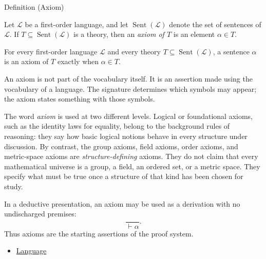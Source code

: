 \begin{definitionbox}{Definition (Axiom)}
\begin{definition}[Axiom]
\label{def:axiom}
Let $\mathcal{L}$ be a first-order language, and let
$\operatorname{Sent}(\mathcal{L})$ denote the set of sentences of
$\mathcal{L}$. If $T\subseteq \operatorname{Sent}(\mathcal{L})$ is a theory,
then an \emph{axiom of $T$} is an element $\alpha\in T$.
\end{definition}
\end{definitionbox}

\begin{remark*}
For every first-order language $\mathcal{L}$ and every theory
$T\subseteq\operatorname{Sent}(\mathcal{L})$, a sentence $\alpha$ is an axiom
of $T$ exactly when $\alpha\in T$.
\end{remark*}

\begin{remark*}[Interpretation]
An axiom is not part of the vocabulary itself. It is an assertion made using
the vocabulary of a language. The signature determines which symbols may
appear; the axiom states something with those symbols.
\end{remark*}

\begin{remark*}[Exposition]
The word \emph{axiom} is used at two different levels. Logical or
foundational axioms, such as the identity laws for equality, belong to the
background rules of reasoning: they say how basic logical notions behave in
every structure under discussion. By contrast, the group axioms, field axioms,
order axioms, and metric-space axioms are \emph{structure-defining} axioms.
They do not claim that every mathematical universe is a group, a field, an
ordered set, or a metric space. They specify what must be true once a
structure of that kind has been chosen for study.
\end{remark*}

\begin{remark*}[Exposition]
In a deductive presentation, an axiom may be used as a derivation with no
undischarged premises:
\[
  \frac{}{\vdash \alpha}.
\]
Thus axioms are the starting assertions of the proof system.
\end{remark*}

\begin{dependencies}
\begin{itemize}
  \item \hyperref[def:language]{Language}
\end{itemize}
\end{dependencies}

